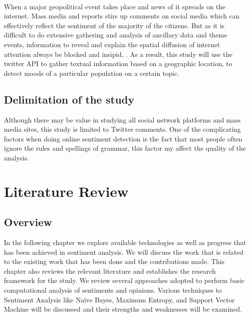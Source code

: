 \leavevmode\\
When a major geopolitical event takes place and news of it spreads on the internet. Mass media and reports stirs up comments on social media which can effectively reflect the sentiment of the majority of the citizens. But as it is difficult to do extensive gathering and analysis of ancillary data and theme events, information to reveal and explain the spatial diffusion of internet attention always be blocked and insipid, \cite{ref22}. As a result, this study will use the twitter API to gather textual information based on a geographic location, to detect moods of a particular population on a certain topic.


\subsection{Delimitation of the study}
Although there may be value in studying all social network platforms and mass media sites, this study is limited to Twitter comments. One of the complicating factors when doing online sentiment detection 
is the fact that most people often ignore the rules and spellings of grammar, this factor my affect the quality of the analysis.


\section{Literature Review}
\subsection{Overview}
In the following chapter we explore available technologies as well as progress that has been achieved in sentiment analysis. We  will discuss the work that is related to the existing work that has been done and the contributions made. This chapter also reviews the relevant literature and establishes the research framework for the study. We review several approaches adopted to perform basic computational analysis of sentiments and opinions. Various techniques to Sentiment Analysis like Naïve Bayes, Maximum Entropy, and Support Vector Machine will be discussed and their strengths and weaknesses will be examined.


